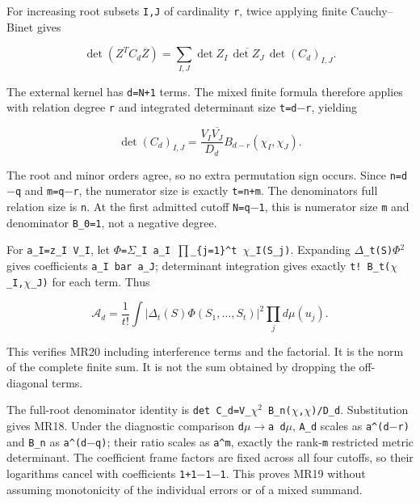 For increasing root subsets \texttt{I,J} of cardinality \texttt{r}, twice applying finite Cauchy--Binet gives

\[
\det(Z^TC_d\overline Z)
=\sum_{I,J}\det Z_I\,\overline{\det Z_J}\,
  \det(C_d)_{I,J}.
\]

The external kernel has \texttt{d=N+1} terms. The mixed finite formula therefore applies with relation degree \texttt{r} and integrated determinant size \texttt{t=d\ensuremath{-}r}, yielding

\[
\det(C_d)_{I,J}
=\frac{V_I\overline{V_J}}{D_d}
 B_{d-r}(\chi_I,\chi_J).
\]

The root and minor orders agree, so no extra permutation sign occurs. Since \texttt{n=d\ensuremath{-}q} and \texttt{m=q\ensuremath{-}r}, the numerator size is exactly \texttt{t=n+m}. The denominator\textquotesingle s full relation size is \texttt{n}. At the first admitted cutoff \texttt{N=q\ensuremath{-}1}, this is numerator size \texttt{m} and denominator \texttt{B\_0=1}, not a negative degree.

For \texttt{a\_I=z\_I\ V\_I}, let \texttt{\ensuremath{\Phi}=\ensuremath{\Sigma}\_I\ a\_I\ \ensuremath{\prod}\_\{j=1\}\^{}t\ \ensuremath{\chi}\_I(S\_j)}. Expanding \texttt{\textbar{}\ensuremath{\Delta}\_t(S)\ensuremath{\Phi}\textbar{}\ensuremath{{}^2}} gives coefficients \texttt{a\_I\ bar\ a\_J}; determinant integration gives exactly \texttt{t!\ B\_t(\ensuremath{\chi}\_I,\ensuremath{\chi}\_J)} for each term. Thus

\[
\mathcal A_d=\frac1{t!}\int|\Delta_t(S)\Phi(S_1,\ldots,S_t)|^2
\prod_jd\mu(u_j).
\]

This verifies MR20 including interference terms and the factorial. It is the norm of the complete finite sum. It is not the sum obtained by dropping the off-diagonal terms.

The full-root denominator identity is \texttt{det\ C\_d=\textbar{}V\_\ensuremath{\chi}\textbar{}\ensuremath{{}^2}\ B\_n(\ensuremath{\chi},\ensuremath{\chi})/D\_d}. Substitution gives MR18. Under the diagnostic comparison \texttt{d\ensuremath{\mu}\ensuremath{\to}a\ d\ensuremath{\mu}}, \texttt{A\_d} scales as \texttt{a\^{}(d\ensuremath{-}r)} and \texttt{B\_n} as \texttt{a\^{}(d\ensuremath{-}q)}; their ratio scales as \texttt{a\^{}m}, exactly the rank-\texttt{m} restricted metric determinant. The coefficient frame factors are fixed across all four cutoffs, so their logarithms cancel with coefficients \texttt{1+1\ensuremath{-}1\ensuremath{-}1}. This proves MR19 without assuming monotonicity of the individual errors or of a mixed summand.

